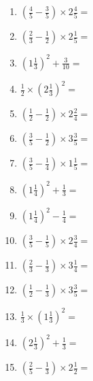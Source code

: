 \documentclass[12pt]{article}
\begin{document}
\begin{enumerate}
\item \large $ \left( \frac{4}{5} - \frac{3}{5} \right) \times 2 \frac{4}{5} = $ \vspace{1.6cm}
\item \large $ \left( \frac{2}{3} - \frac{1}{2} \right) \times 2 \frac{1}{5} = $ \vspace{1.6cm}
\item \large $ \left( 1 \frac{1}{3} \right)^2 + \frac{3}{10} = $ \vspace{1.6cm}
\item \large $ \frac{1}{2} \times \left( 2 \frac{1}{3} \right)^2 = $ \vspace{1.6cm}
\item \large $ \left( \frac{1}{2} - \frac{1}{2} \right) \times 2 \frac{2}{4} = $ \vspace{1.6cm}
\item \large $ \left( \frac{3}{5} - \frac{1}{2} \right) \times 3 \frac{3}{5} = $ \vspace{1.6cm}
\item \large $ \left( \frac{3}{5} - \frac{1}{4} \right) \times 1 \frac{1}{5} = $ \vspace{1.6cm}
\item \large $ \left( 1 \frac{1}{4} \right)^2 + \frac{1}{3} = $ \vspace{1.6cm}
\item \large $ \left( 1 \frac{1}{4} \right)^2 - \frac{1}{4} = $ \vspace{1.6cm}
\item \large $ \left( \frac{3}{5} - \frac{1}{5} \right) \times 2 \frac{3}{4} = $ \vspace{1.6cm}
\newpage
\item \large $ \left( \frac{2}{3} - \frac{1}{3} \right) \times 3 \frac{1}{4} = $ \vspace{1.6cm}
\item \large $ \left( \frac{1}{2} - \frac{1}{3} \right) \times 3 \frac{3}{5} = $ \vspace{1.6cm}
\item \large $ \frac{1}{3} \times \left( 1 \frac{1}{3} \right)^2 = $ \vspace{1.6cm}
\item \large $ \left( 2 \frac{1}{3} \right)^2 + \frac{1}{3} = $ \vspace{1.6cm}
\item \large $ \left( \frac{2}{5} - \frac{1}{3} \right) \times 2 \frac{1}{2} = $ \vspace{1.6cm}

\end{enumerate}
\end{document}
